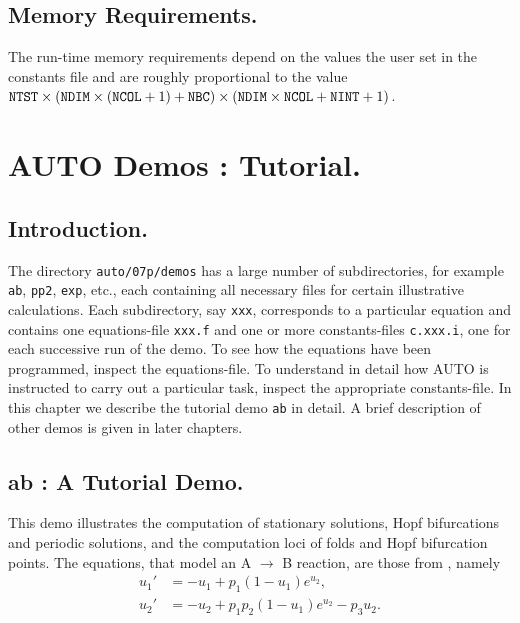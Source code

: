 \documentclass[12pt]{report}
\begin{document}
\section{ Memory Requirements.} \label{sec:Memory_requirements}
The run-time memory requirements depend on the values the user set in
the constants file and are roughly proportional to the value
${\tt NTST}\times({\tt NDIM}\times({\tt NCOL}+1)+{\tt NBC})\times
({\tt NDIM}\times{\tt NCOL}+{\tt NINT}+1)$.

\chapter{ {\cal AUTO} Demos : Tutorial.} \label{ch:Demos:_Tutorial}
\newpage
\section{ Introduction.} \label{sec:Tutorial_Introduction}
The directory {\tt auto/07p/demos} has a large number of subdirectories,
for example {\tt ab}, {\tt pp2}, {\tt exp}, etc.,
each containing all necessary files for certain illustrative calculations.
Each subdirectory, say {\tt xxx}, corresponds to a particular equation
and contains one equations-file {\tt xxx.f}
and one or more constants-files {\tt c.xxx.i}, 
one for each successive run of the demo.
To see how the equations have been programmed, inspect the equations-file. 
To understand in detail how {\cal AUTO} is instructed to carry out a 
particular task, inspect the appropriate constants-file.
In this chapter we describe the tutorial demo {\tt ab} in detail.
A brief description of other demos is given in later chapters.


\section{ ab : A Tutorial Demo.} \label{sec:Demos_ab}
This demo illustrates the computation of 
stationary solutions,
Hopf bifurcations 
and 
periodic solutions,
and the computation loci of folds and Hopf bifurcation points.
The equations, that model an A $\to$ B  reaction, are those from
 \citeyear{URP:74}, namely
\begin{equation} \begin{array}{cl}
  u_1 ' &=  -u_1 + p_1 (1-u_1) e^{u_2}, \\
  u_2 ' &=  -u_2 +  p_1 p_2 ( 1-u_1) e^{u_2} - p_3 u_2.\\
\end{array} \end{equation}
\end{document}
